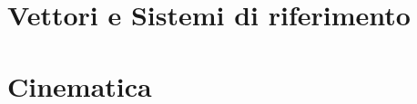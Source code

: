 \documentclass[a4paper, titlepage]{report}%
\theoremstyle{definition} %
\theoremstyle{plain}
\theoremstyle{plain}
\theoremstyle{remark}
\theoremstyle{remark}
\begin{document}
    
\section{Vettori e Sistemi di riferimento}

    

\section{Cinematica}
    
    
\end{document}
